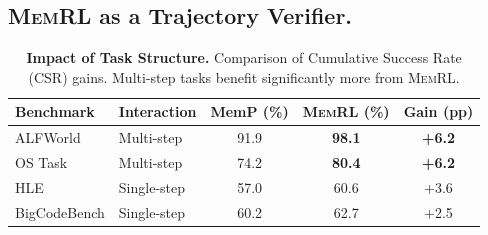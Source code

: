 \documentclass{article}
\theoremstyle{plain}
\theoremstyle{definition}
\theoremstyle{remark}
\begin{document}
\subsection{\textsc{MemRL} as a Trajectory Verifier.}

    
    
\begin{table}[h]  %
    \centering
    \footnotesize
    \setlength{\tabcolsep}{1.5pt}

    \caption{\textbf{Impact of Task Structure.} Comparison of Cumulative Success Rate (CSR) gains. Multi-step tasks benefit significantly more from \textsc{MemRL}.}
    \label{tab:horizon_analysis}

    \begin{tabular}{@{}l l c c c@{}}
        \toprule
        \textbf{Benchmark} & \textbf{Interaction} & \textbf{MemP (\%)} & \textbf{\textsc{MemRL} (\%)} & \textbf{Gain (pp)} \\
        \midrule
        ALFWorld     & Multi-step  & 91.9 & \textbf{98.1} & \textbf{+6.2} \\
        OS Task      & Multi-step  & 74.2 & \textbf{80.4} & \textbf{+6.2}  \\
        HLE          & Single-step & 57.0 & 60.6 & +3.6 \\
        BigCodeBench & Single-step & 60.2 & 62.7 & +2.5 \\
        \bottomrule
    \end{tabular}
\vskip -5pt
\end{table}
\end{document}
